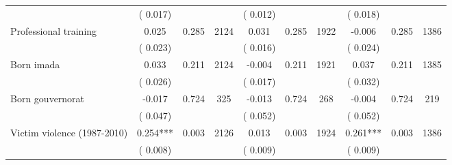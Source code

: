 \begin{tabular}{l*{9}{c}}
                               &        (       0.017) & &                                                                 &       (       0.012) & &                                                          &       (       0.018) & &                                          \\ 
 Professional training                        &              0.025                &        0.285 & 2124                &              0.031 &        0.285 & 1922                       &       -0.006 &        0.285 & 1386                             \\ 
                               &        (       0.023) & &                                                                        &       (       0.016) & &                                                         &       (       0.024) & &                                         \\ 
 Born imada                        &              0.033                &        0.211 & 2124                &             -0.004 &        0.211 & 1921                       &        0.037 &        0.211 & 1385                             \\ 
                               &        (       0.026) & &                                                                        &       (       0.017) & &                                                         &       (       0.032) & &                                         \\ 
 Born gouvernorat                        &             -0.017                &        0.724 & 325                &             -0.013 &        0.724 & 268                       &       -0.004 &        0.724 & 219                             \\ 
                               &        (       0.047) & &                                                                        &       (       0.052) & &                                                         &       (       0.052) & &                                         \\ 
 Victim violence (1987-2010)                        &              0.254***                 &        0.003 & 2126                &              0.013 &        0.003 & 1924                       &        0.261*** &        0.003 & 1386                               \\ 
                               &        (       0.008) & &                                                                        &       (       0.009) & &                                                         &       (       0.009) & &                                         \\ 
\hline \end{tabular}                                                                                                                                                      